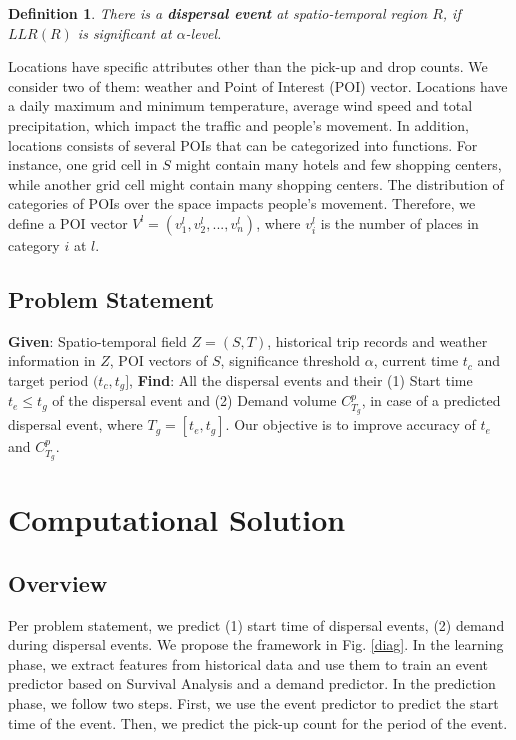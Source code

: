 \documentclass[letterpaper]{article} %
\newtheorem{definition}{Definition}
\begin{document}
\begin{definition}
	There is a \textbf{dispersal event} at spatio-temporal region $R$, if $LLR(R)$ is significant at $\alpha$-level.
	\label{disE}
\end{definition}

Locations have specific attributes other than the pick-up and drop counts. We consider two of them: weather and Point of Interest (POI) vector. Locations have a daily maximum and minimum temperature, average wind speed and total precipitation, which impact the traffic and people's movement. In addition, locations consists of several POIs that can be categorized into functions. For instance, one grid cell in $S$ might contain many hotels and few shopping centers, while another grid cell might contain many shopping centers. The distribution of categories of POIs over the space impacts people's movement. Therefore, we define a POI vector $V^l=(v^l_1,v^l_2,...,v^l_n)$, where $v^l_i$ is the number of places in category $i$ at $l$.

\subsection{Problem Statement}

\textbf{Given}: Spatio-temporal field $Z=(S,T)$, historical trip records and weather information in $Z$, POI vectors of $S$, significance threshold $\alpha$, current time $t_c$ and target period $(t_c,t_g]$, \textbf{Find}: All the dispersal events and their (1) Start time $t_e\leq t_g$ of the dispersal event and (2) Demand volume $C^p_{T_g}$, in case of a predicted dispersal event, where $T_g=[t_e,t_g]$. Our objective is to improve accuracy of $t_e$ and $C^p_{T_g}$.






\section{Computational Solution}
\label{solution}
\subsection{Overview}
Per problem statement, we predict (1) start time of dispersal events, (2) demand during dispersal events. We propose the framework in Fig. \ref{diag}. In the learning phase, we extract features from historical data and use them to train an event predictor based on Survival Analysis and a demand predictor. In the prediction phase, we follow two steps. First, we use the event predictor to predict the start time of the event. Then, we predict the pick-up count for the period of the event.
\end{document}
